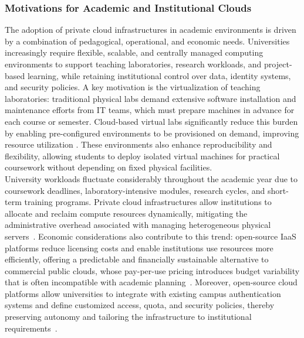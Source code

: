 \documentclass[sigplan]{acmart}
\begin{document}
        \subsubsection{Motivations for Academic and Institutional Clouds}
            The adoption of private cloud infrastructures in academic environments is driven by a combination of pedagogical, operational, and economic needs. Universities increasingly require flexible, scalable, and centrally managed computing environments to support teaching laboratories, research workloads, and project-based learning, while retaining institutional control over data, identity systems, and security policies. A key motivation is the virtualization of teaching laboratories: traditional physical labs demand extensive software installation and maintenance efforts from IT teams, which must prepare machines in advance for each course or semester. Cloud-based virtual labs significantly reduce this burden by enabling pre-configured environments to be provisioned on demand, improving resource utilization \cite{bonnerUsingOpenStackImprove2013, alvesUsingCloudBuild2014}. These environments also enhance reproducibility and flexibility, allowing students to deploy isolated virtual machines for practical coursework without depending on fixed physical facilities.\\
            
            University workloads fluctuate considerably throughout the academic year due to coursework deadlines, laboratory-intensive modules, research cycles, and short-term training programs. Private cloud infrastructures allow institutions to allocate and reclaim compute resources dynamically, mitigating the administrative overhead associated with managing heterogeneous physical servers~\cite{sheelaDeployingOpenStackCloud2017}. Economic considerations also contribute to this trend: open-source IaaS platforms reduce licensing costs and enable institutions use resources more efficiently, offering a predictable and financially sustainable alternative to commercial public clouds, whose pay-per-use pricing introduces budget variability that is often incompatible with academic planning~\cite{vijayakumarPrivateCloudInfrastructure2025, alvesUsingCloudBuild2014, bonnerUsingOpenStackImprove2013}. Moreover, open-source cloud platforms allow universities to integrate with existing campus authentication systems and define customized access, quota, and security policies, thereby preserving autonomy and tailoring the infrastructure to institutional requirements~\cite{lynnComparativeStudyCurrent2015, oleksiukExperienceMaintenanceAcademic2021}.\\
            
\end{document}
